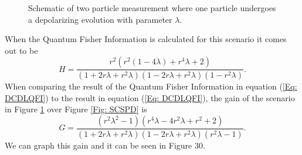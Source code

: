 \documentclass[twocolumn]{article}
\begin{document}
\begin{figure}[ht]
    \caption{\footnotesize{Schematic of two particle measurement where one particle undergoes a depolarizing evolution with parameter $\lambda$.}}
    \label{Fig: DCDL}
\end{figure}
\par \noindent
When the Quantum Fisher Information is calculated for this scenario it comes out to be
\begin{equation}\label{Eq: DCDLQFI}
H=\frac{r^2(r^2(1-4\lambda)+r^4\lambda+2)}{(1+2r\lambda+r^2\lambda)(1-2r\lambda+r^2\lambda)(1-r^2\lambda)}.
\end{equation}
When comparing the result of the Quantum Fisher Information in equation (\ref{Eq: DCDLQFI}) to the result in equation (\ref{Eq: DCDLQFI}), the gain of the scenario in Figure \ref{Fig: DCDL} over Figure \ref{Fig: SCSPD} is
\begin{equation}\label{Eq: DCDLG}
G=\frac{(r^2\lambda^2-1)(r^4\lambda-4r^2\lambda+r^2+2)}{(1+2r\lambda+r^2\lambda)(1-2r\lambda+r^2\lambda)(r^2\lambda-1)}.
\end{equation}
We can graph this gain and it can be seen in Figure 30.
\end{document}
